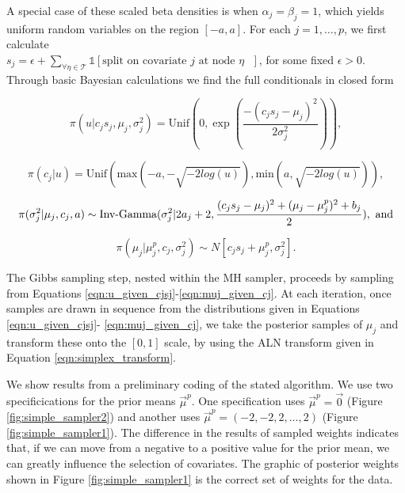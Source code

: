 A special case of these scaled beta densities is when $\alpha_j=\beta_j=1$, which yields uniform random variables on the region $[-a,a]$. 
For each $j=1, \dots, p$, we first calculate \\
 $s_j = \epsilon+\sum_{\forall \eta \in \mathcal{T}}\mathds{1}[\text{split on covariate $j$ at node $\eta$ } ]$, for some fixed $\epsilon>0$.
Through basic Bayesian calculations we find the full conditionals in closed form
 
\begin{equation}\label{eqn:u_given_cjsj}
\pi(u \vert c_js_j, \mu_j, \sigma_j^2)= \text{Unif}(0, \exp{(\frac{-(c_js_j-\mu_j)^2}{2\sigma_j^2} )}),
\end{equation}

\begin{equation}
\pi(c_j \vert u) = \text{Unif}(\text{max}(-a,-\sqrt{-2log(u)}), \text{min}(a,\sqrt{-2log(u)} )),
\end{equation}

\begin{equation}
\pi(\sigma^2_j \vert \mu_j, c_j, a) \sim \text{Inv-Gamma}({\sigma_j^2}\vert{2a_j+2},{\frac{(c_js_j-\mu_j)^2+ (\mu_j-\mu_j^p)^2+b_j}{2}}), \text{ and}
\end{equation}

\begin{equation}\label{eqn:muj_given_cj}
\pi(\mu_j\vert \mu_j^p, c_j, \sigma^2_j)\sim N[c_js_j+\mu_j^p, \sigma_j^2].
\end{equation}

 The Gibbs sampling step, nested within the MH sampler, proceeds by sampling from Equations \ref{eqn:u_given_cjsj}-\ref{eqn:muj_given_cj}.
At each iteration, once samples are drawn in sequence from the distributions given in Equations \ref{eqn:u_given_cjsj}- \ref{eqn:muj_given_cj}, we take the posterior samples of $\mu_j$ and transform these onto the $[0,1]$ scale, by using the ALN transform given in Equation \ref{eqn:simplex_transform}. 

We show results from a preliminary coding of the stated algorithm. We use two specificications for the prior means $\vec{\mu}^p$. One specification uses  $\vec{\mu}^p = \vec{0}$ (Figure \ref{fig:simple_sampler2}) and another uses $\vec{\mu}^p=(-2,-2,2,\dots,2)$ (Figure \ref{fig:simple_sampler1}). The difference in the results of sampled weights indicates that, if we can move from a negative to a positive value for the prior mean, we can greatly influence the selection of covariates. The graphic of posterior weights shown in Figure \ref{fig:simple_sampler1} is the correct set of weights for the data. 


